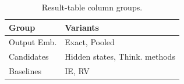 \begin{table}
  \vspace{-0.6em}
  \caption{Result-table column groups.}
  \label{tab:candidate-blocks}
  \centering
  \footnotesize
  \setlength{\tabcolsep}{4pt}
  \renewcommand{\arraystretch}{1.15}
  \begin{tabular}{@{}l l@{}}
    \toprule
    \textbf{Group} & \textbf{Variants} \\
    \midrule
    Output Emb. & Exact, Pooled \\
    Candidates       & Hidden states, Think. methods \\
    Baselines        & IE, RV \\
    \bottomrule
  \end{tabular}
  \vspace{-0.6em}
\end{table}
